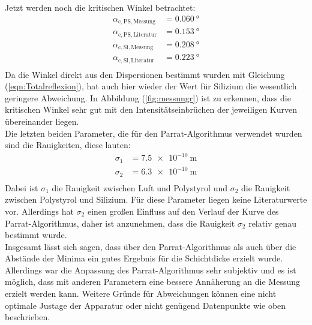 \noindent Jetzt werden noch die kritischen Winkel betrachtet:
\begin{align*}
  \alpha_\mathrm{c,PS,Messung}&=\SI{0.060}{\degree} \\
  \alpha_\mathrm{c,PS,Literatur}&=\SI{0.153}{\degree} \\
  \alpha_\mathrm{c,Si,Messung}&=\SI{0.208}{\degree} \\
  \alpha_\mathrm{c,Si,Literatur}&=\SI{0.223}{\degree} \\
\end{align*}
Da die Winkel direkt aus den Dispersionen bestimmt wurden mit Gleichung (\ref{eqn:Totalreflexion}), hat auch hier wieder der Wert für Silizium die wesentlich geringere Abweichung.
In Abbildung (\ref{fig:messungr}) ist zu erkennen, dass die kritischen Winkel sehr gut mit den Intensitätseinbrüchen der jeweiligen Kurven übereinander liegen. \\

\noindent Die letzten beiden Parameter, die für den Parrat-Algorithmus verwendet wurden sind die Rauigkeiten, diese lauten:
\begin{align*}
  \sigma_\mathrm{1} &=\SI{7.5 e-10}{\meter} \\
  \sigma_\mathrm{2} &=\SI{6.3 e-10}{\meter} \\
\end{align*}
Dabei ist $\sigma_\mathrm{1}$ die Rauigkeit zwischen Luft und Polystyrol und $\sigma_\mathrm{2}$ die Rauigkeit zwischen Polystyrol und Silizium. Für diese Parameter liegen
keine Literaturwerte vor. Allerdings hat $\sigma_\mathrm{2}$ einen großen Einfluss auf den Verlauf der Kurve des Parrat-Algorithmus, daher ist anzunehmen, dass die
Rauigkeit $\sigma_\mathrm{2}$ relativ genau bestimmt wurde.\\

\noindent Insgesamt lässt sich sagen, dass über den Parrat-Algorithmus als auch über die Abstände der Minima ein gutes Ergebnis für die Schichtdicke erzielt wurde. Allerdings
war die Anpassung des Parrat-Algorithmus sehr subjektiv und es ist möglich, dass mit anderen Parametern eine bessere Annäherung an die Messung erzielt werden kann.
Weitere Gründe für Abweichungen können eine nicht optimale Justage der Apparatur oder nicht genügend Datenpunkte wie oben beschrieben.
